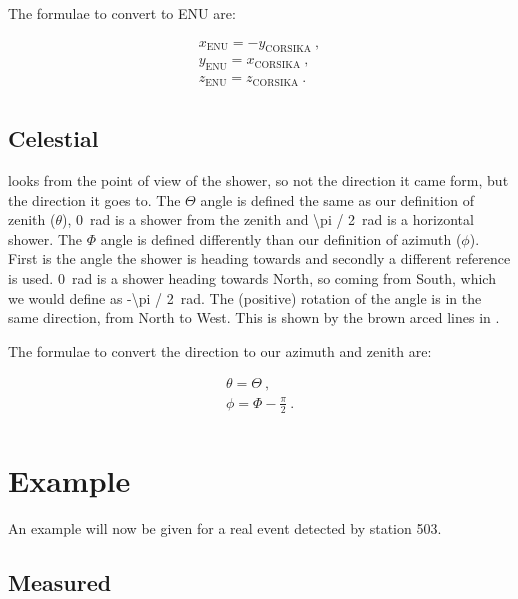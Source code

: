The formulae to convert \corsika to ENU are:

\begin{equation}
    \begin{array}{l}
        x_{\mathrm{ENU}} = -y_{\mathrm{CORSIKA}} \ , \\
        y_{\mathrm{ENU}} = x_{\mathrm{CORSIKA}} \ , \\
        z_{\mathrm{ENU}} = z_{\mathrm{CORSIKA}} \ . \\
    \end{array}
\end{equation}


\subsection{Celestial}

\corsika looks from the point of view of the shower, so not the
direction it came form, but the direction it goes to. The $\Theta$ angle
is defined the same as our definition of zenith ($\theta$),
\SI{0}{\radian} is a shower from the zenith and \SI{\pi / 2}{\radian} is
a horizontal shower. The $\Phi$ angle is defined differently than our
definition of azimuth ($\phi$). First is the angle the shower is heading
towards and secondly a different reference is used. \SI{0}{\radian} is a
shower heading towards North, so coming from South, which we would
define as \SI{-\pi / 2}{\radian}. The (positive) rotation of the angle
is in the same direction, from North to West. This is shown by the brown
arced lines in .

The formulae to convert the \corsika direction to our azimuth and zenith
are:

\begin{equation}
    \begin{array}{l}
        \theta = \Theta \ , \\
        \phi = \Phi - \frac{\pi}{2} \ . \\
    \end{array}
\end{equation}


\section{Example}
\label{sec:example}

An example will now be given for a real \hisparc event detected by
station 503.


\subsection{Measured}

